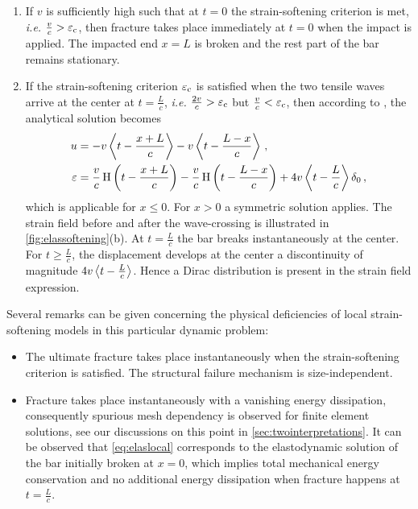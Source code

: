 \begin{enumerate}
\item If $v$ is sufficiently high such that at $t=0$ the strain-softening criterion is met, \emph{i.e.} $\frac{v}{c}>\varepsilon_{\mathrm{c}}$, then fracture takes place immediately at $t=0$ when the impact is applied. The impacted end $x=L$ is broken and the rest part of the bar remains stationary.

\item If the strain-softening criterion $\varepsilon_{\mathrm{c}}$ is satisfied when the two tensile waves arrive at the center at $t=\frac{L}{c}$, \emph{i.e.} $\frac{2v}{c}>\varepsilon_{\mathrm{c}}$ but $\frac{v}{c}<\varepsilon_{\mathrm{c}}$, then according to \cite{Bazant:1985aa}, the analytical solution becomes
\begin{equation} \label{eq:elaslocal}
\begin{aligned}
u &= -v\Braket{t-\frac{x+L}{c}}-v\Braket{t-\frac{L-x}{c}}\,, \\
\varepsilon &= \frac{v}{c}\operatorname{H}\left(t-\frac{x+L}{c}\right)-\frac{v}{c}\operatorname{H}\left(t-\frac{L-x}{c}\right)+4v\Braket{t-\frac{L}{c}}\delta_0\,,
\end{aligned}
\end{equation}
which is applicable for $x\leq 0$. For $x>0$ a symmetric solution applies. The strain field before and after the wave-crossing is illustrated in \cref{fig:elassoftening}(b). At $t=\frac{L}{c}$ the bar breaks instantaneously at the center. For $t\geq\frac{L}{c}$, the displacement develops at the center a discontinuity of magnitude $4v\Braket{t-\frac{L}{c}}$. Hence a Dirac distribution is present in the strain field expression.
\end{enumerate}

Several remarks can be given concerning the physical deficiencies of local strain-softening models in this particular dynamic problem:
\begin{itemize}
\item The ultimate fracture takes place instantaneously when the strain-softening criterion is satisfied. The structural failure mechanism is size-independent.

\item Fracture takes place instantaneously with a vanishing energy dissipation, consequently spurious mesh dependency is observed for finite element solutions, see our discussions on this point in \cref{sec:twointerpretations}. It can be observed that \eqref{eq:elaslocal} corresponds to the elastodynamic solution of the bar initially broken at $x=0$, which implies total mechanical energy conservation and no additional energy dissipation when fracture happens at $t=\frac{L}{c}$.
\end{itemize}

